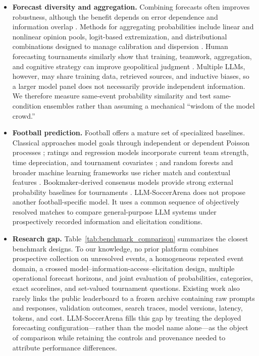 \documentclass[sigconf,review]{acmart}
\newcommand{\arena}{\mbox{LLM-SoccerArena}\xspace}
\newenvironment{draftbullets}
  {\begin{itemize}[leftmargin=1.25em,itemsep=1.5pt,topsep=2pt,parsep=0pt,partopsep=0pt]}
  {\end{itemize}}
\begin{document}
\begin{draftbullets}
  \item \textbf{Forecast diversity and aggregation.} Combining forecasts often improves robustness,
  although the benefit depends on error dependence and information overlap \citep{clemen_1989}.
  Methods for aggregating probabilities include linear and nonlinear opinion pools, logit-based
  extremization, and distributional combinations designed to manage calibration and dispersion
  \citep{gneiting_ranjan_2013,satopaa_etal_2014,lichtendahl_etal_2013}. Human forecasting tournaments
  similarly show that training, teamwork, aggregation, and cognitive strategy can improve geopolitical
  judgment \citep{tetlock_2005,mellers_etal_2014}. Multiple LLMs, however, may share training data,
  retrieved sources, and inductive biases, so a larger model panel does not necessarily provide
  independent information. We therefore measure same-event probability similarity and test
  same-condition ensembles rather than assuming a mechanical ``wisdom of the model crowd.''

  \item \textbf{Football prediction.} Football offers a mature set of specialized baselines.
  Classical approaches model goals through independent or dependent Poisson processes
  \citep{maher_1982,dixon_coles_1997,karlis_ntzoufras_2003,koopman_lit_2015}; ratings and regression
  models incorporate current team strength, time depreciation, and tournament covariates
  \citep{hvattum_arntzen_2010,ley_etal_2019,groll_etal_2015}; and random forests and broader machine
  learning frameworks use richer match and contextual features
  \citep{schauberger_groll_2018,sportsprediction,beal_etal_2021}. Bookmaker-derived consensus models
  provide strong external probability baselines for tournaments
  \citep{leitner_etal_2010,zeileis_etal_2018}. \arena does not propose another football-specific model.
  It uses a common sequence of objectively resolved matches to compare general-purpose LLM systems
  under prospectively recorded information and elicitation conditions.

  \item \textbf{Research gap.} Table~\ref{tab:benchmark_comparison} summarizes the closest benchmark
  designs. To our knowledge, no prior platform combines prospective collection on unresolved events,
  a homogeneous repeated event domain, a crossed model--information-access--elicitation design,
  multiple operational forecast horizons, and joint evaluation of probabilities, categories, exact
  scorelines, and set-valued tournament questions. Existing work also rarely links the public
  leaderboard to a frozen archive containing raw prompts and responses, validation outcomes, search
  traces, model versions, latency, tokens, and cost. \arena fills this gap by treating the deployed
  forecasting configuration---rather than the model name alone---as the object of comparison while
  retaining the controls and provenance needed to attribute performance differences.
\end{draftbullets}
\end{document}

